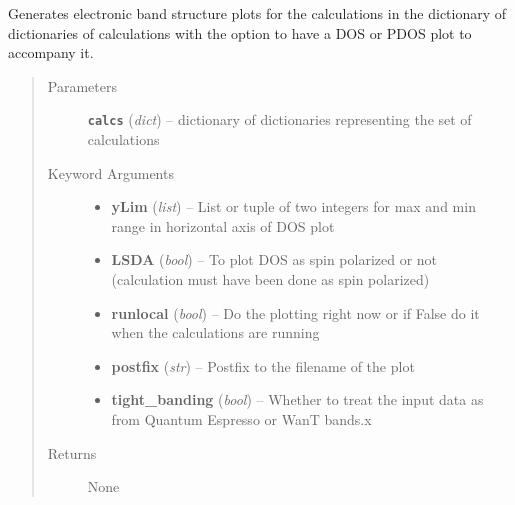 \documentclass[letterpaper,10pt,english]{sphinxmanual}
\begin{document}

\begin{fulllineitems}
\label{plot:plot.opdos}
Generates electronic band structure plots for the calculations in the dictionary of dictionaries
of calculations with the option to have a DOS or PDOS plot to accompany it.
\begin{quote}\begin{description}
\item[{Parameters}] \leavevmode
\textbf{\texttt{calcs}} (\emph{dict}) -- dictionary of dictionaries representing the set of calculations

\item[{Keyword Arguments}] \leavevmode\begin{itemize}
\item {} 
\textbf{yLim} (\emph{list}) --
List or tuple of two integers for max and min range in horizontal axis of DOS plot

\item {} 
\textbf{LSDA} (\emph{bool}) --
To plot DOS as spin polarized or not (calculation must have been done as spin polarized)

\item {} 
\textbf{runlocal} (\emph{bool}) --
Do the plotting right now or if False do it when the calculations are running

\item {} 
\textbf{postfix} (\emph{str}) --
Postfix to the filename of the plot

\item {} 
\textbf{tight\_banding} (\emph{bool}) --
Whether to treat the input data as from Quantum Espresso or WanT bands.x

\end{itemize}

\item[{Returns}] \leavevmode
None

\end{description}\end{quote}

\end{fulllineitems}


\begin{fulllineitems}
\label{plot:plot.phonon}
\end{fulllineitems}
\end{document}
